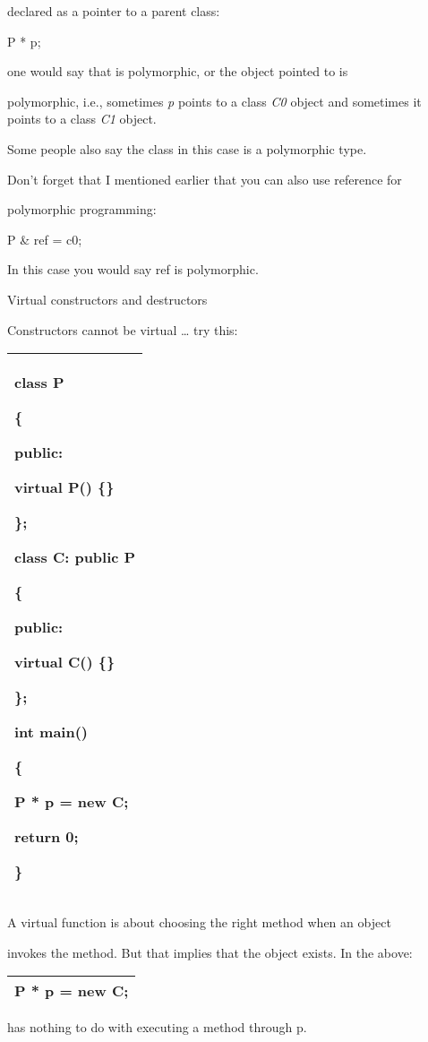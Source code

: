 \documentclass[
]{article}
\begin{document}
declared as a pointer to a parent class:

P * p;

one would say that is polymorphic, or the object pointed to is

polymorphic, i.e., sometimes \emph{p} points to a class \emph{C0} object
and sometimes it points to a class \emph{C1} object.

Some people also say the class in this case is a polymorphic type.

Don't forget that I mentioned earlier that you can also use reference
for

polymorphic programming:

P \& ref = c0;

In this case you would say ref is polymorphic.

Virtual constructors and destructors

Constructors cannot be virtual \ldots{} try this:

\begin{longtable}[]{@{}l@{}}
\toprule
\endhead
\begin{minipage}[t]{0.97\columnwidth}\raggedright
class P

\{

public:

virtual P() \{\}

\};

class C: public P

\{

public:

virtual C() \{\}

\};

int main()

\{

P * p = new C;

return 0;

\}\strut
\end{minipage}\tabularnewline
\bottomrule
\end{longtable}

A virtual function is about choosing the right method when an object

invokes the method. But that implies that the object exists. In the
above:

\begin{longtable}[]{@{}l@{}}
\toprule
\endhead
P * p = new C;\tabularnewline
\bottomrule
\end{longtable}

has nothing to do with executing a method through p.
\end{document}
